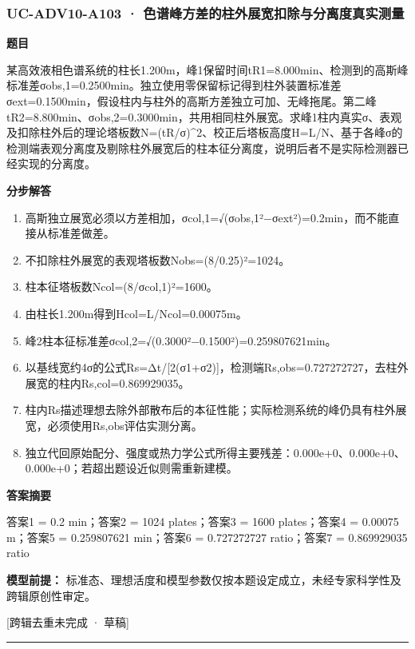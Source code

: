 \documentclass[UTF8,11pt,a4paper]{ctexart}
\begin{document}
\subsubsection*{UC-ADV10-A103 · 色谱峰方差的柱外展宽扣除与分离度真实测量}
\noindent\textbf{题目}\par
某高效液相色谱系统的柱长1.200m，峰1保留时间tR1=8.000min、检测到的高斯峰标准差σobs,1=0.2500min。独立使用零保留标记得到柱外装置标准差σext=0.1500min，假设柱内与柱外的高斯方差独立可加、无峰拖尾。第二峰tR2=8.800min、σobs,2=0.3000min，共用相同柱外展宽。求峰1柱内真实σ、表观及扣除柱外后的理论塔板数N=(tR/σ)\textasciicircum{}2、校正后塔板高度H=L/N、基于各峰σ的检测端表观分离度及剔除柱外展宽后的柱本征分离度，说明后者不是实际检测器已经实现的分离度。\par
\medskip\noindent\textbf{分步解答}
\begin{enumerate}
\item 高斯独立展宽必须以方差相加，σcol,1=√(σobs,1²−σext²)=0.2min，而不能直接从标准差做差。
\item 不扣除柱外展宽的表观塔板数Nobs=(8/0.25)²=1024。
\item 柱本征塔板数Ncol=(8/σcol,1)²=1600。
\item 由柱长1.200m得到Hcol=L/Ncol=0.00075m。
\item 峰2柱本征标准差σcol,2=√(0.3000²−0.1500²)=0.259807621min。
\item 以基线宽约4σ的公式Rs=Δt/[2(σ1+σ2)]，检测端Rs,obs=0.727272727，去柱外展宽的柱内Rs,col=0.869929035。
\item 柱内Rs描述理想去除外部散布后的本征性能；实际检测系统的峰仍具有柱外展宽，必须使用Rs,obs评估实测分离。
\item 独立代回原始配分、强度或热力学公式所得主要残差：0.000e+0、0.000e+0、0.000e+0；若超出题设近似则需重新建模。
\end{enumerate}
\noindent\textbf{答案摘要}\par
答案1 = 0.2 min；答案2 = 1024 plates；答案3 = 1600 plates；答案4 = 0.00075 m；答案5 = 0.259807621 min；答案6 = 0.727272727 ratio；答案7 = 0.869929035 ratio\par
\noindent\textbf{模型前提：}
标准态、理想活度和模型参数仅按本题设定成立，未经专家科学性及跨辑原创性审定。\par
\noindent\textcolor{red!65!black}{[跨辑去重未完成 · 草稿]} \par
\medskip\hrule\medskip
{}
\end{document}
